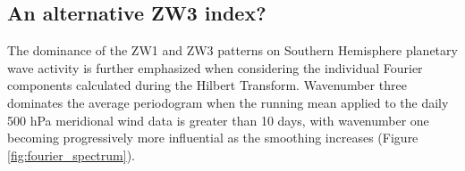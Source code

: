 \subsection{An alternative ZW3 index?}

The dominance of the ZW1 and ZW3 patterns on Southern Hemisphere planetary wave activity is further emphasized when considering the individual Fourier components calculated during the Hilbert Transform. Wavenumber three dominates the average periodogram when the running mean applied to the daily 500 hPa meridional wind data is greater than 10 days, with wavenumber one becoming progressively more influential as the smoothing increases (Figure \ref{fig:fourier_spectrum}).

